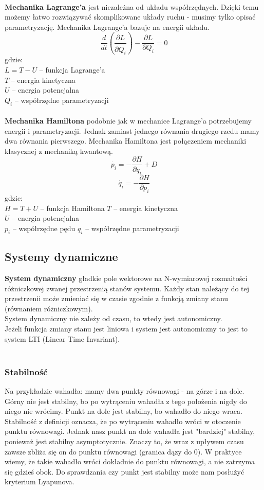 \documentclass[12pt]{article}
\begin{document}
~\\
\textbf{Mechanika Lagrange'a} jest niezależna od układu współrzędnych. Dzięki temu możemy łatwo rozwiązywać skomplikowane układy ruchu - musimy tylko opisać parametryzację. Mechanika Lagrange'a bazuje na energii układu. 
$$ \dfrac{d}{dt} (\dfrac{\partial L}{\partial\dot{Q_{i}}}) - \dfrac{\partial L}{\partial Q_{i}} = 0$$
gdzie: \\
$L = T - U$ -- funkcja Lagrange'a\\
$T$ -- energia kinetyczna \\
$U$ -- energia potencjalna \\
$Q_{i}$ -- współrzędne parametryzacji\\
~\\
\textbf{Mechanika Hamiltona} podobnie jak w mechanice Lagrange'a potrzebujemy energii i parametryzacji. Jednak zamiast jednego równania drugiego rzedu mamy dwa równania pierwszego. Mechanika Hamiltona jest połączeniem mechaniki klasycznej z mechaniką kwantową.
$$ \dot{p_{i}} = - \dfrac{\partial H}{\partial q_{i}} + D $$
$$ \dot{q_{i}} = - \dfrac{\partial H}{\partial p_{i}} $$
gdzie: \\
$H = T + U $ -- funkcja Hamiltona
$T$ -- energia kinetyczna \\
$U$ -- energia potencjalna \\
$p_{i}$ -- współrzędne pędu
$q_{i}$ -- współrzędne parametryzacji

\subsection{Systemy dynamiczne}
\textbf{System dynamiczny} gładkie pole wektorowe na N-wymiarowej rozmaitości różniczkowej zwanej przestrzenią stanów systemu. Każdy stan należący do tej przestrzenii może zmieniać się w czasie zgodnie z funkcją zmiany stanu (równaniem różniczkowym). \\
System dynamiczny nie zależy od czasu, to wtedy jest autonomiczny. \\
Jeżeli funkcja zmiany stanu jest liniowa i system jest autonomiczny to jest to system LTI (Linear Time Invariant).\\
~\\
\subsubsection{Stabilność}
Na przykładzie wahadła: mamy dwa punkty równowagi - na górze i na dole. Górny nie jest stabilny, bo po wytrąceniu wahadła z tego położenia nigdy do niego nie wrócimy. Punkt na dole jest stabilny, bo wahadło do niego wraca. Stabilność z definicji oznacza, że po wytrąceniu wahadło wróci w otoczenie punktu równowagi. Jednak nasz punkt na dole wahadła jest "bardziej" stabilny, ponieważ jest stabilny asymptotycznie. Znaczy to, że wraz z upływem czasu zawsze zbliża się on do punktu równowagi (granica dązy do 0). W praktyce wiemy, że takie wahadło wróci dokładnie do punktu równowagi, a nie zatrzyma się gdzieś obok. Do sprawdzania czy punkt jest stabilny może nam posłużyć kryterium Lyapunova.\\
\end{document}
